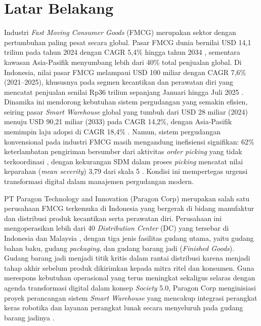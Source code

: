 \section{Latar Belakang}
Industri \textit{Fast Moving Consumer Goods} (FMCG) merupakan sektor dengan pertumbuhan paling pesat secara global. Pasar FMCG dunia bernilai USD 14,1 triliun pada tahun 2024 dengan CAGR 5,4\% hingga tahun 2034 \autocite{researchandmarkets2025}, sementara kawasan Asia-Pasifik menyumbang lebih dari 40\% total penjualan global. Di Indonesia, nilai pasar FMCG melampaui USD 100 miliar dengan CAGR 7,6\% (2021--2025), khususnya pada segmen kecantikan dan perawatan diri yang mencatat penjualan senilai Rp36 triliun sepanjang Januari hingga Juli 2025 \autocite{kadin2025}. Dinamika ini mendorong kebutuhan sistem pergudangan yang semakin efisien, seiring pasar \textit{Smart Warehouse} global yang tumbuh dari USD 28 miliar (2024) menuju USD 90,21 miliar (2033) pada CAGR 14,2\%, dengan Asia-Pasifik memimpin laju adopsi di CAGR 18,4\% \autocite{precedenceresearch2025}. Namun, sistem pergudangan konvensional pada industri FMCG masih mengandung inefisiensi signifikan: 62\% keterlambatan pengiriman bersumber dari aktivitas \textit{order picking} yang tidak terkoordinasi \autocite{framinan2025}, dengan kekurangan SDM dalam proses \textit{picking} mencatat nilai keparahan (\textit{mean severity}) 3,79 dari skala 5 \autocite{habazin2017}. Kondisi ini mempertegas urgensi transformasi digital dalam manajemen pergudangan modern.

PT Paragon Technology and Innovation (Paragon Corp) merupakan salah satu perusahaan FMCG terkemuka di Indonesia yang bergerak di bidang manufaktur dan distribusi produk kecantikan serta perawatan diri. Perusahaan ini mengoperasikan lebih dari 40 \textit{Distribution Center} (DC) yang tersebar di Indonesia dan Malaysia \autocite{undip2019}, dengan tiga jenis fasilitas gudang utama, yaitu gudang bahan baku, gudang \textit{packaging}, dan gudang barang jadi (\textit{Finished Goods}). Gudang barang jadi menjadi titik kritis dalam rantai distribusi karena menjadi tahap akhir sebelum produk dikirimkan kepada mitra ritel dan konsumen. Guna merespons kebutuhan operasional yang terus meningkat sekaligus selaras dengan agenda transformasi digital dalam konsep \textit{Society} 5.0, Paragon Corp menginisiasi proyek perancangan sistem \textit{Smart Warehouse} yang mencakup integrasi perangkat keras robotika dan layanan perangkat lunak secara menyeluruh pada gudang barang jadinya \autocite{docB100}.

